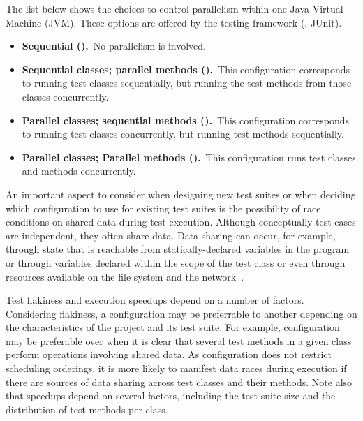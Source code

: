\documentclass[10pt,journal,compsoc]{IEEEtran}
\begin{document}
The list below shows the choices to control parallelism within one
Java Virtual Machine (JVM).  These options are offered by the testing
framework (\eg{}, JUnit).

\begin{itemize}
\item
    \textbf{Sequential (\Seq).}~No parallelism is involved.
\item
    \textbf{Sequential classes; parallel methods
      (\SeqClassParMeth).}~This configuration corresponds to running
    test classes sequentially, but running the test methods from those
    classes concurrently.
\item
    \textbf{Parallel classes; sequential methods
      (\ParClassSeqMeth{}).}~This configuration corresponds to running
    test classes concurrently, but running test methods sequentially.
\item
    \textbf{Parallel classes; Parallel methods
      (\ParClassParMeth).}~This configuration runs test classes and
    methods concurrently.
\end{itemize}

An important aspect to consider when designing new test suites or when
deciding which configuration to use for existing test suites is the
possibility of race conditions on shared data during test
execution. Although conceptually test cases are independent, they
often share data. Data
sharing can occur, for example, through state that is reachable from
statically-declared variables in the program or through variables
declared within the scope of the test class or even through resources
available on the file system and the network~\cite{luo-etal-fse2014}.

Test flakiness and execution speedups depend on a number of
factors. Considering flakiness, a configuration may be preferrable to
another depending on the characteristics of the project and its test
suite. For example, configuration \ParClassSeqMeth{} may be preferable
over \SeqClassParMeth{} when it is clear that several test methods in
a given class perform operations involving shared data. As
configuration \ParClassParMeth{} does not restrict scheduling
orderings, it is more likely to manifest data races during execution
if there are sources of data sharing across test classes and their
methods. Note also that speedups depend on several factors, including
the test suite size and the distribution of test methods per class.
\end{document}

